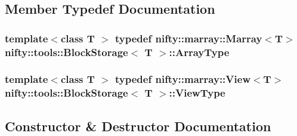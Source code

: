 \subsection{Member Typedef Documentation}
\hypertarget{classnifty_1_1tools_1_1BlockStorage_af39a2936478b64389c56a5c6ef5aab7d}{}
\subsubsection[{Array\+Type}]{\setlength{\rightskip}{0pt plus 5cm}template$<$class T $>$ typedef {\bf nifty\+::marray\+::\+Marray}$<$T$>$ {\bf nifty\+::tools\+::\+Block\+Storage}$<$ T $>$\+::{\bf Array\+Type}}\label{classnifty_1_1tools_1_1BlockStorage_af39a2936478b64389c56a5c6ef5aab7d}
\hypertarget{classnifty_1_1tools_1_1BlockStorage_afe259433c35f56d01be0b597a696e090}{}
\subsubsection[{View\+Type}]{\setlength{\rightskip}{0pt plus 5cm}template$<$class T $>$ typedef {\bf nifty\+::marray\+::\+View}$<$T$>$ {\bf nifty\+::tools\+::\+Block\+Storage}$<$ T $>$\+::{\bf View\+Type}}\label{classnifty_1_1tools_1_1BlockStorage_afe259433c35f56d01be0b597a696e090}


\subsection{Constructor \& Destructor Documentation}
\hypertarget{classnifty_1_1tools_1_1BlockStorage_a95d95c49b1a1ed51c6d794d3fe8f2645}{}
